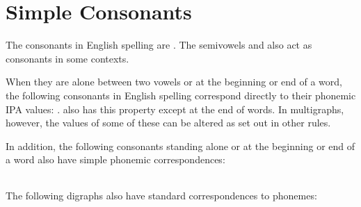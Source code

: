 \section{Simple Consonants}

The consonants in English spelling are . The semivowels  and  also act as consonants in some
contexts.

When they are alone between two vowels or at the beginning or end of a word, the
following consonants in English spelling correspond directly to their phonemic
IPA values: .  also has this property
except at the end of words. In multigraphs, however, the values of some of these
can be altered as set out in other rules.

In addition, the following consonants standing alone or at the beginning or end
of a word also have simple phonemic correspondences:

\begin{tabular}{ l r }

\end{tabular}

The following digraphs also have standard correspondences to phonemes:

\begin{tabular}{l r}
\end{tabular}

